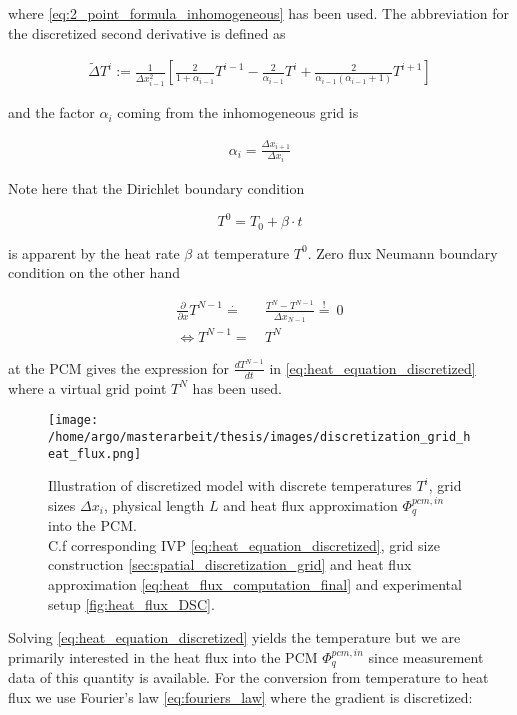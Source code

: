 \documentclass{scrartcl}[12pt, halfparskip]
\numberwithin{equation}{section}
\numberwithin{figure}{section}
\numberwithin{table}{section}
\begin{document}
where \cref{eq:2_point_formula_inhomogeneous} has been used. The abbreviation for the discretized second derivative is defined as

\begin{align}
	\tilde{\Delta} T^i := \frac{1}{\Delta x_{i-1}^2} \left[ \frac{2}{1+\alpha_{i-1}} T^{i-1} - \frac{2}{\alpha_{i-1}} T^{i} + \frac{2}{\alpha_{i-1} (\alpha_{i-1} + 1)} T^{i+1} \right]
\end{align}

and the factor $\alpha_i$ coming from the inhomogeneous grid is

\begin{align}
	\alpha_i = \frac{\Delta x_{i+1}}{\Delta x_{i}}
\end{align}

Note here that the Dirichlet boundary condition 

\begin{equation}
	T^0 = T_0 + \beta \cdot t
\end{equation}

is apparent by the heat rate $\beta$ at temperature $T^0$. Zero flux Neumann boundary condition on the other hand

\begin{align}
	\frac{\partial}{\partial x} T^{N-1} \stackrel{\cdot}{=} & \ \frac{T^N - T^{N-1}}{\Delta x_{N-1}} \stackrel{!}{=} \ 0 \\
	\Leftrightarrow T^{N-1} = & \ T^N
\end{align}

 at the PCM gives the expression for $\frac{d T^{N-1}}{dt}$ in \cref{eq:heat_equation_discretized} where a virtual grid point $T^N$ has been used.

\begin{figure}[H]
	\centering
	\texttt{[image: /home/argo/masterarbeit/thesis/images/discretization\_grid\_heat\_flux.png]}
	\caption{Illustration of discretized model with discrete temperatures $T^i$, grid sizes $\Delta x_i$, physical length $L$ and heat flux approximation $\varPhi_q^{pcm,in}$ into the PCM. \\
	C.f	corresponding IVP \cref{eq:heat_equation_discretized}, grid size construction \cref{sec:spatial_discretization_grid} and heat flux approximation \cref{eq:heat_flux_computation_final} and experimental setup \cref{fig:heat_flux_DSC}.}
	\label{fig:mathematical_model_discretized}
\end{figure}


Solving \cref{eq:heat_equation_discretized} yields the temperature but we are primarily interested in the heat flux into the PCM $\varPhi_{q}^{pcm,in}$ since measurement data of this quantity is available. For the conversion from temperature to heat flux we use Fourier's law \cref{eq:fouriers_law} where the gradient is discretized:
\end{document}
